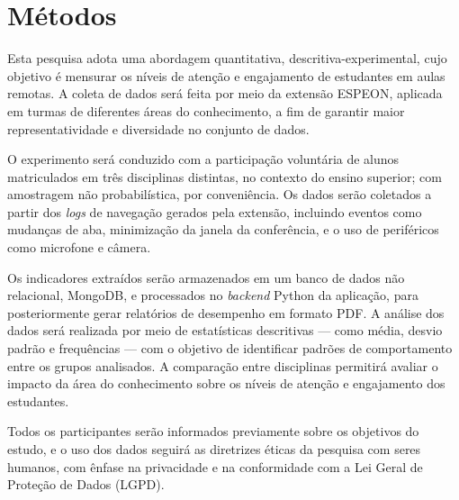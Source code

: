 \section{Métodos}\label{sec:methods}
Esta pesquisa adota uma abordagem quantitativa, descritiva-experimental, cujo objetivo é mensurar os níveis de atenção e engajamento de estudantes em aulas remotas. A coleta de dados será feita por meio da extensão ESPEON, aplicada em turmas de diferentes áreas do conhecimento, a fim de garantir maior representatividade e diversidade no conjunto de dados.

O experimento será conduzido com a participação voluntária de alunos matriculados em três disciplinas distintas, no contexto do ensino superior; com amostragem não probabilística, por conveniência. Os dados serão coletados a partir dos \textit{logs} de navegação gerados pela extensão, incluindo eventos como mudanças de aba, minimização da janela da conferência, e o uso de periféricos como microfone e câmera.

Os indicadores extraídos serão armazenados em um banco de dados não relacional, MongoDB, e processados no \textit{backend} Python da aplicação, para posteriormente gerar relatórios de desempenho em formato PDF. A análise dos dados será realizada por meio de estatísticas descritivas — como média, desvio padrão e frequências —  com o objetivo de identificar padrões de comportamento entre os grupos analisados. A comparação entre disciplinas permitirá avaliar o impacto da área do conhecimento sobre os níveis de atenção e engajamento dos estudantes.

Todos os participantes serão informados previamente sobre os objetivos do estudo, e o uso dos dados seguirá as diretrizes éticas da pesquisa com seres humanos, com ênfase na privacidade e na conformidade com a Lei Geral de Proteção de Dados (LGPD).
